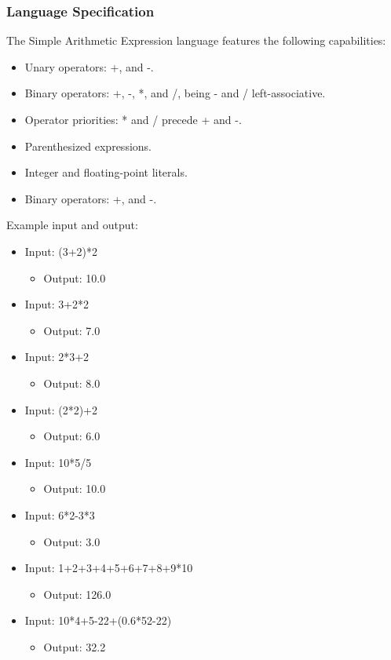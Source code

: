 \documentclass[a4paper,twoside,onecolumn]{article}
\begin{document}
\subsubsection{Language Specification}
The Simple Arithmetic Expression language features the following capabilities:

\begin{itemize}
\item Unary operators: +, and -.
\item Binary operators: +, -, *, and /, being - and / left-associative.
\item Operator priorities: * and / precede + and -.
\item Parenthesized expressions.
\item Integer and floating-point literals.
\item Binary operators: +, and -.
\end{itemize}

Example input and output:  

\begin{itemize}
\item Input: (3+2)*2 
\begin{itemize} \item Output: 10.0 \end{itemize}
\item Input: 3+2*2 
\begin{itemize} \item Output: 7.0 \end{itemize}
\item Input: 2*3+2 
\begin{itemize} \item Output: 8.0 \end{itemize}
\item Input: (2*2)+2 
\begin{itemize} \item Output: 6.0 \end{itemize}
\item Input: 10*5/5 
\begin{itemize} \item Output: 10.0 \end{itemize}
\item Input: 6*2-3*3 
\begin{itemize} \item Output: 3.0 \end{itemize}
\item Input: 1+2+3+4+5+6+7+8+9*10 
\begin{itemize} \item Output: 126.0 \end{itemize}
\item Input: 10*4+5-22+(0.6*52-22) 
\begin{itemize} \item Output: 32.2 \end{itemize}
\end{itemize}
\end{document}
